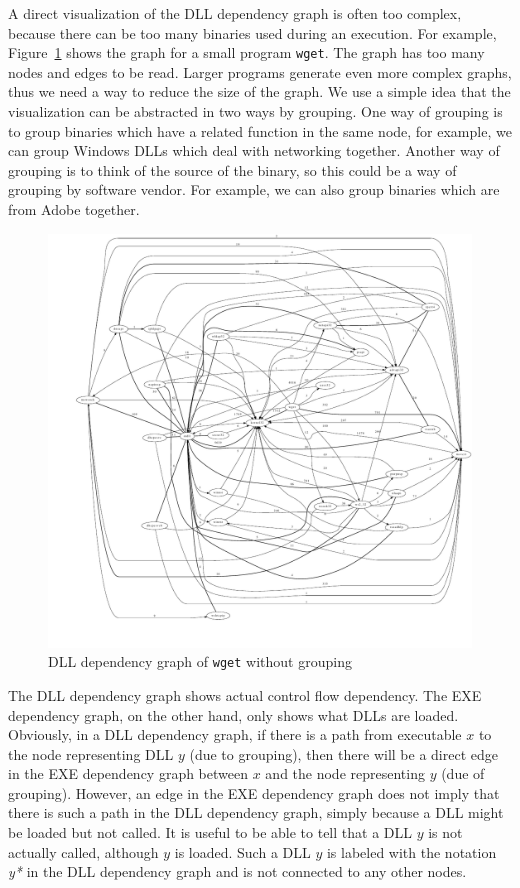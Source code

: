 A direct visualization of the DLL dependency graph is often too complex,
because there can be too many binaries used during an execution.
For example, Figure~\ref{fig:wget-nogroup} shows the graph for a
small program {\tt wget}.
The graph has too many nodes and edges to be read.
Larger programs generate even more complex graphs, thus we need
a way to reduce the size of the graph.
We use a simple idea that the visualization can be abstracted in two ways
by grouping.
One way of grouping is to group binaries which have a related function
in the same node, for example, we can group Windows DLLs which deal with
networking together.
Another way of grouping is to think of the source of the binary, so this
could be a way of grouping by software vendor.
For example, we can also group binaries which are from Adobe together.

\begin{figure}[htb]
\centering
\includegraphics[width=1.0\textwidth]{depvis/wget-nogroup.pdf}
\caption{DLL dependency graph of {\tt wget} without grouping}
\label{fig:wget-nogroup}
\end{figure}

The DLL dependency graph shows actual control flow dependency.
The EXE dependency graph, on the other hand, only shows what
DLLs are loaded. Obviously, in a DLL dependency graph,
if there is a path from executable $x$ to the node representing
DLL $y$ (due to grouping), then there will
be a direct edge in the EXE dependency graph between $x$ and the node
representing $y$ (due of grouping).
However, an edge in the EXE dependency graph does not imply that there is
such a path in the DLL dependency graph, simply because a DLL might
be loaded but not called.
It is useful to be able to tell that a DLL $y$ is not actually called,
although $y$ is loaded.
Such a DLL $y$ is labeled with the notation {\it *y*} in the DLL dependency
graph and is not connected to any other nodes.

